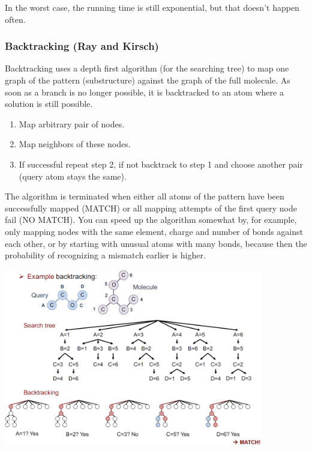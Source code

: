 In the worst case, the running time is still exponential, but that doesn't happen often.

\subsubsection{Backtracking (Ray and Kirsch)}

Backtracking uses a depth first algorithm (for the searching tree) to map one graph of the pattern (substructure) against the graph of the full molecule. As soon as a branch is no longer possible, it is backtracked to an atom where a solution is still possible.

\begin{enumerate}
    \item Map arbitrary pair of nodes.
    \item Map neighbors of these nodes.
    \item If successful repeat step 2, if not backtrack to step 1 and choose another pair (query atom stays the same).
\end{enumerate}

The algorithm is terminated when either all atoms of the pattern have been successfully mapped (MATCH) or all mapping attempts of the first query node fail (NO MATCH). You can speed up the algorithm somewhat by, for example, only mapping nodes with the same element, charge and number of bonds against each other, or by starting with unusual atoms with many bonds, because then the probability of recognizing a mismatch earlier is higher.

\begin{center}\includegraphics[width=0.85\textwidth]{img/cheminformatics/SubstructureBacktracking.png}\end{center}


